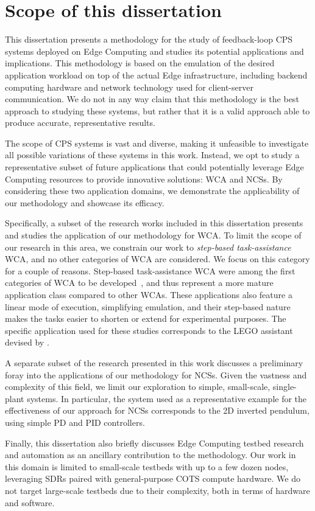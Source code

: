 \section{Scope of this dissertation}

This dissertation presents a methodology for the study of feedback-loop \gls{CPS} systems deployed on Edge Computing and studies its potential applications and implications.
This methodology is based on the emulation of the desired application workload on top of the actual Edge infrastructure, including backend computing hardware and network technology used for client-server communication.
We do not in any way claim that this methodology is the best approach to studying these systems, but rather that it is a valid approach able to produce accurate, representative results.

The scope of \gls{CPS} systems is vast and diverse, making it unfeasible to investigate all possible variations of these systems in this work. 
Instead, we opt to study a representative subset of future applications that could potentially leverage Edge Computing resources to provide innovative solutions: \gls{WCA} and \glspl{NCS}.
By considering these two application domains, we demonstrate the applicability of our methodology and showcase its efficacy.

Specifically, a subset of the research works included in this dissertation presents and studies the application of our methodology for \gls{WCA}.
To limit the scope of our research in this area, we constrain our work to \emph{step-based task-assistance} \gls{WCA}, and no other categories of \gls{WCA} are considered.
We focus on this category for a couple of reasons.
Step-based task-assistance \gls{WCA} were among the first categories of \gls{WCA} to be developed~\cite{chen2015early}, and thus represent a more mature application class compared to other \glspl{WCA}.
These applications also feature a linear mode of execution, simplifying emulation, and their step-based nature makes the tasks easier to shorten or extend for experimental purposes.
The specific application used for these studies corresponds to the LEGO assistant devised by \citeauthor{chen2015early}\cite{chen2015early}.

A separate subset of the research presented in this work discusses a preliminary foray into the applications of our methodology for \glspl{NCS}.
Given the vastness and complexity of this field, we limit our exploration to simple, small-scale, single-plant systems.
In particular, the system used as a representative example for the effectiveness of our approach for \glspl{NCS} corresponds to the \gls{2D} inverted pendulum, using simple \gls{PD} and \gls{PID} controllers.

Finally, this dissertation also briefly discusses Edge Computing testbed research and automation as an ancillary contribution to the methodology.
Our work in this domain is limited to small-scale testbeds with up to a few dozen nodes, leveraging \glspl{SDR} paired with general-purpose \gls{COTS} compute hardware.
We do not target large-scale testbeds due to their complexity, both in terms of hardware and software.